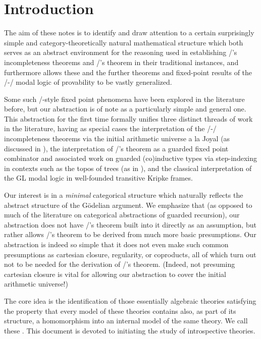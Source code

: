 \filestart

\section{Introduction}
The aim of these notes is to identify and draw attention to a certain surprisingly simple and category-theoretically natural mathematical structure which both serves as an abstract environment for the reasoning used in establishing \Goedel/'s incompleteness theorems and \Loeb/'s theorem in their traditional instances, and furthermore allows these and the further theorems and fixed-point results of the \Goedel/-\Loeb/ modal logic of provability to be vastly generalized.

Some such \Loeb/-style fixed point phenomena have been explored in the literature before, but our abstraction is of note as a particularly simple and general one. This abstraction for the first time formally unifies three distinct threads of work in the literature, having as special cases the interpretation of the \Goedel/-\Loeb/ incompleteness theorems via the initial arithmetic universe a la Joyal (as discussed in \autocite{van2020g}), the interpretation of \Loeb/'s theorem as a guarded fixed point combinator and associated work on guarded (co)inductive types via step-indexing in contexts such as the topos of trees (as in \autocite{birkedal2011first}), and the classical interpretation of the GL modal logic in well-founded transitive Kripke frames.

Our interest is in a \emph{minimal} categorical structure which naturally reflects the abstract structure of the G\"odelian argument. We emphasize that (as opposed to much of the literature on categorical abstractions of guarded recursion), our abstraction does not have \Loeb/'s theorem built into it directly as an assumption, but rather allows \Loeb/'s theorem to be derived from much more basic presumptions. Our abstraction is indeed so simple that it does not even make such common presumptions as cartesian closure, regularity, or coproducts, all of which turn out not to be needed for the derivation of \Loeb/'s theorem. (Indeed, not presuming cartesian closure is vital for allowing our abstraction to cover the initial arithmetic universe!)

The core idea is the identification of those essentially algebraic theories satisfying the property that every model of these theories contains also, as part of its structure, a homomorphism into an internal model of the same theory. We call these . This document is devoted to initiating the study of introspective theories.

